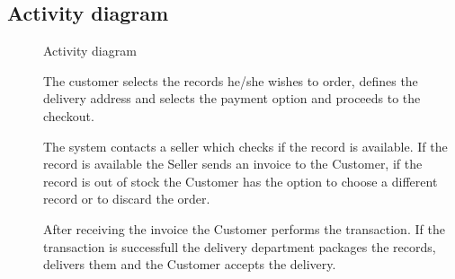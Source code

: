 \documentclass[11pt,a4paper]{article}
\begin{document}
\subsection{Activity diagram}
\begin{figure}[htb]
    \begin{center}
        \setlength\fboxsep{0pt}
        \caption{Activity diagram}
        \label{fig:activ_diag}
    \end{center}
\end{figure}
\begin{description}
    \item[]
        The customer selects the records he/she wishes to order, defines the delivery
        address and selects the payment option and proceeds to the checkout.
    \item[]
        The system contacts a seller which checks if the record is available.
        If the record is available the Seller sends an invoice to the Customer,
        if the record is out of stock the Customer has the option to choose a different
        record or to discard the order.
    \item[]
        After receiving the invoice the Customer performs the transaction.
        If the transaction is successfull the delivery department packages the records,
        delivers them and the Customer accepts the delivery.
\end{description}
\end{document}
